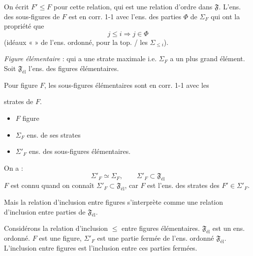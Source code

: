\documentclass[11pt,a4paper]{article}
\begin{document}
On écrit $F' \leq F$ pour cette relation, qui est une relation d'ordre dans $\mathfrak{F}$. L'ens. des sous-figures de $F$ est en corr. 1-1 avec l'ens. des parties $\Phi$  de \struck{$\Sigma$} $\Sigma_F$  qui ont la propriété que 
\[
  j \leq i \Longrightarrow j \in \Phi
\]
(idéaux \struck{\ill{}} «  » de l'ens. \struck{\ill{}} ordonné, pour la top. \ill{}    /  les $\Sigma_{\leq i}$).

\emph{Figure élémentaire} : qui a une strate maximale i.e. $\Sigma_F$ a un plus grand élément. Soit $\mathfrak{F}_{\mathrm{él}}$ l'ens. des figures élémentaires. 

Pour  figure $F$, les sous-figures élémentaires sont en corr. 1-1 avec les

strates de $F$. 
\begin{itemize}
  \item[] $F$ figure
  \item[] $\Sigma_F$ ens. de ses strates
  \item[] $\Sigma'_F$ ens. des sous-figures élémentaires.
\end{itemize}
On a :
\[
  \Sigma'_F \simeq \Sigma_F, \qquad \Sigma'_F \subset \mathfrak{F}_{\mathrm{él}}
\]
$F$ est connu quand on connaît $\Sigma'_F \subset \mathfrak{F}_{\mathrm{él}}$, car $F$ est l'ens. des strates des $F' \in \Sigma'_F$.

Mais la relation d'inclusion entre figures s'interprète comme une relation d'inclusion entre parties de $\mathfrak{F}_{\mathrm{él}}$.

 Considérons la relation d'inclusion $\leq$ entre figures élémentaires.   $\mathfrak{F}_{\mathrm{él}}$ est un ens. ordonné.   $F$ est une figure, $\Sigma'_F$ est une  partie fermée de l'ens. ordonné $\mathfrak{F}_{\mathrm{él}}$. L'inclusion entre figures est l'inclusion entre ces parties fermées.
\end{document}
